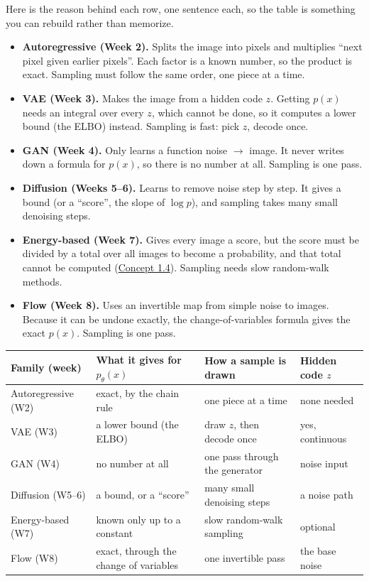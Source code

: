\documentclass[12pt,a4paper]{article}
\begin{document}
Here is the reason behind each row, one sentence each, so the table is something you can rebuild rather than memorize.
\begin{itemize}[nosep]
  \item \textbf{Autoregressive (Week 2).} Splits the image into pixels and multiplies ``next pixel given earlier pixels''. Each factor is a known number, so the product is exact. Sampling must follow the same order, one piece at a time.
  \item \textbf{VAE (Week 3).} Makes the image from a hidden code $z$. Getting $p(x)$ needs an integral over every $z$, which cannot be done, so it computes a lower bound (the ELBO) instead. Sampling is fast: pick $z$, decode once.
  \item \textbf{GAN (Week 4).} Only learns a function noise $\to$ image. It never writes down a formula for $p(x)$, so there is no number at all. Sampling is one pass.
  \item \textbf{Diffusion (Weeks 5--6).} Learns to remove noise step by step. It gives a bound (or a ``score'', the slope of $\log p$), and sampling takes many small denoising steps.
  \item \textbf{Energy-based (Week 7).} Gives every image a score, but the score must be divided by a total over all images to become a probability, and that total cannot be computed (\hyperref[c1-4]{Concept 1.4}). Sampling needs slow random-walk methods.
  \item \textbf{Flow (Week 8).} Uses an invertible map from simple noise to images. Because it can be undone exactly, the change-of-variables formula gives the exact $p(x)$. Sampling is one pass.
\end{itemize}

\begin{center}
\begin{tabular}{@{}>{\raggedright\arraybackslash}p{}>{\raggedright\arraybackslash}p{}>{\raggedright\arraybackslash}p{}>{\raggedright\arraybackslash}p{}@{}}
\toprule
Family (week) & What it gives for $p_\theta(x)$ & How a sample is drawn & Hidden code $z$ \\
\midrule
Autoregressive (W2) & exact, by the chain rule & one piece at a time & none needed \\
VAE (W3) & a lower bound (the ELBO) & draw $z$, then decode once & yes, continuous \\
GAN (W4) & no number at all & one pass through the generator & noise input \\
Diffusion (W5--6) & a bound, or a ``score'' & many small denoising steps & a noise path \\
Energy-based (W7) & known only up to a constant & slow random-walk sampling & optional \\
Flow (W8) & exact, through the change of variables & one invertible pass & the base noise \\
\bottomrule
\end{tabular}
\end{center}
\end{document}
